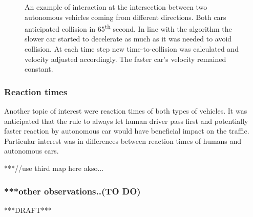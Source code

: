 \documentclass[11pt,english]{article}
\begin{document}
\begin{figure}[!] %
\caption{An example of interaction at the intersection between two autonomous vehicles coming from different directions. Both cars anticipated collision in 65\textsuperscript{th} second. In line with the algorithm the slower car started to decelerate as much as it was needed to avoid collision. At each time step new time-to-collision was calculated and velocity adjusted accordingly. The faster car's velocity remained constant.}
\label{fig:interactions_example_2}
\end{figure}





\subsubsection{Reaction times}


Another topic of interest were reaction times of both types of vehicles. It was anticipated that the rule to always let human driver pass first and potentially faster reaction by autonomous car would have beneficial impact on the traffic. Particular interest was in differences between reaction times of humans and autonomous cars.

***//use third map here akso...





\subsubsection{***other observations..(TO DO)}


***DRAFT***
\end{document}
